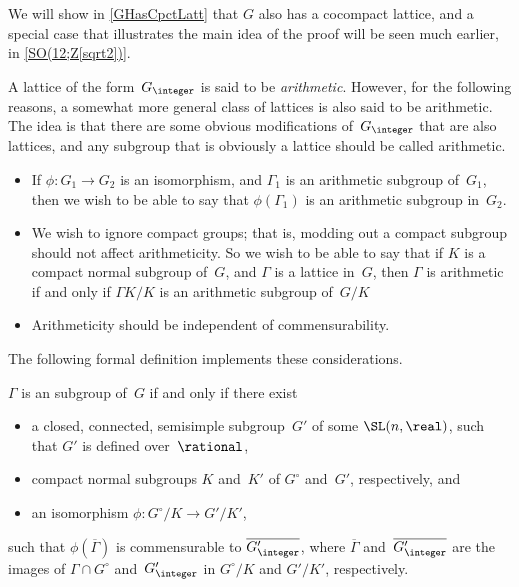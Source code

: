\begin{rem}
We will show in \cref{GHasCpctLatt} that $G$ also has a cocompact lattice, and a special case that illustrates the main idea of the proof will be seen much earlier, in \cref{SO(12;Z[sqrt2])}.
\end{rem}

A lattice of the form~$G_{\integer}$ is said to be
\emph{arithmetic}.  However, for the following reasons, a
somewhat more general class of lattices is also said to be
arithmetic. The idea is that there are some obvious
modifications of~$G_{\integer}$ that are also lattices, and
any subgroup that is obviously a lattice should be called
arithmetic.
 \begin{itemize}
 \item If $\phi \colon G_1 \to G_2$ is an isomorphism, and
$\Gamma_1$ is an arithmetic subgroup of~$G_1$, then we wish
to be able to say that $\phi(\Gamma_1)$ is an arithmetic
subgroup in~$G_2$.
 \item We wish to ignore compact
groups; that is, modding out a compact subgroup should not
affect arithmeticity. So we wish to be able to say that if
$K$ is a compact normal subgroup of~$G$, and $\Gamma$ is a
lattice in~$G$, then $\Gamma$ is arithmetic if and only if
$\Gamma K/K$ is an arithmetic subgroup of~$G/K$
 \item Arithmeticity should be independent of
commensurability. 
 \end{itemize}
 The following formal definition implements these
considerations.

\begin{defn} \label{ArithDefn}
 $\Gamma$ is an  subgroup of~$G$ if and
only if there exist
 \begin{itemize}
 \item a closed, connected, semisimple subgroup~$G'$ of
some $\SL(n,\real)$, such that $G'$ is defined
over~$\rational$,
 \item compact normal subgroups $K$ and~$K'$ of $G^\circ$
and~$G'$, respectively, and
 \item an isomorphism $\phi \colon G^\circ/K \to G'/K'$, 
 \end{itemize}
 such that $\phi(\overline{\Gamma})$ is commensurable to
$\overline{G'_{\integer}}$, where $\overline{\Gamma}$
and~$\overline{G'_{\integer}}$ are the images of $\Gamma \cap G^\circ$
and~$G'_{\integer}$ in $G^\circ/K$ and $G'/K'$, respectively.
 \end{defn}

